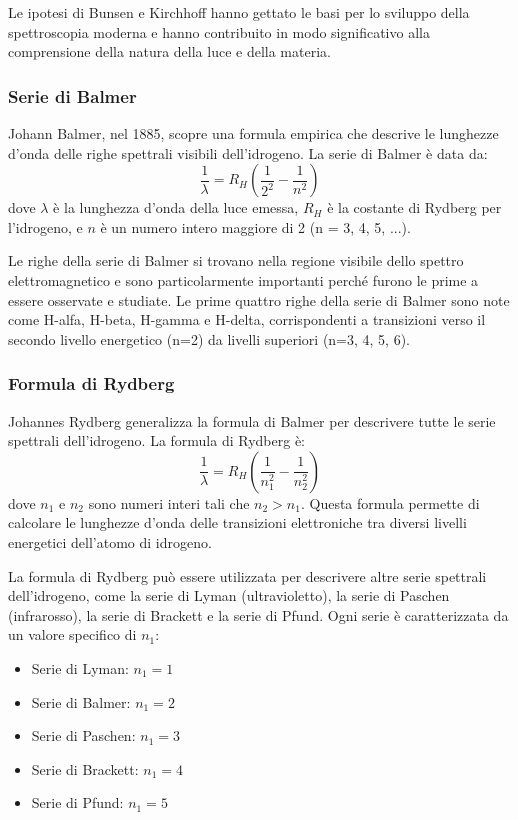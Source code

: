 Le ipotesi di Bunsen e Kirchhoff hanno gettato le basi per lo sviluppo della spettroscopia moderna e hanno contribuito in modo significativo alla comprensione della natura della luce e della materia.

\subsubsection*{Serie di Balmer}
Johann Balmer, nel 1885, scopre una formula empirica che descrive le lunghezze d'onda delle righe spettrali visibili dell'idrogeno. La serie di Balmer è data da:
\[
\frac{1}{\lambda} = R_H \left( \frac{1}{2^2} - \frac{1}{n^2} \right)
\]
dove \( \lambda \) è la lunghezza d'onda della luce emessa, \( R_H \) è la costante di Rydberg per l'idrogeno, e \( n \) è un numero intero maggiore di 2 (n = 3, 4, 5, ...).

Le righe della serie di Balmer si trovano nella regione visibile dello spettro elettromagnetico e sono particolarmente importanti perché furono le prime a essere osservate e studiate. Le prime quattro righe della serie di Balmer sono note come H-alfa, H-beta, H-gamma e H-delta, corrispondenti a transizioni verso il secondo livello energetico (n=2) da livelli superiori (n=3, 4, 5, 6).

\subsubsection*{Formula di Rydberg}
Johannes Rydberg generalizza la formula di Balmer per descrivere tutte le serie spettrali dell'idrogeno. La formula di Rydberg è:
\[
\frac{1}{\lambda} = R_H \left( \frac{1}{n_1^2} - \frac{1}{n_2^2} \right)
\]
dove \( n_1 \) e \( n_2 \) sono numeri interi tali che \( n_2 > n_1 \). Questa formula permette di calcolare le lunghezze d'onda delle transizioni elettroniche tra diversi livelli energetici dell'atomo di idrogeno.

La formula di Rydberg può essere utilizzata per descrivere altre serie spettrali dell'idrogeno, come la serie di Lyman (ultravioletto), la serie di Paschen (infrarosso), la serie di Brackett e la serie di Pfund. Ogni serie è caratterizzata da un valore specifico di \( n_1 \):
\begin{itemize}
    \item Serie di Lyman: \( n_1 = 1 \)
    \item Serie di Balmer: \( n_1 = 2 \)
    \item Serie di Paschen: \( n_1 = 3 \)
    \item Serie di Brackett: \( n_1 = 4 \)
    \item Serie di Pfund: \( n_1 = 5 \)
\end{itemize}

